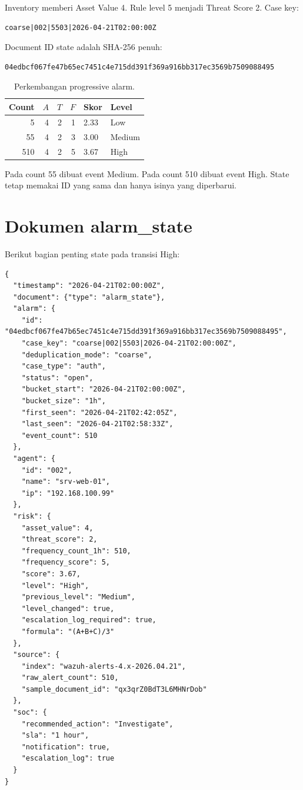 \documentclass[11pt,a4paper,oneside]{report}
\begin{document}
Inventory memberi Asset Value 4. Rule level 5 menjadi Threat Score 2. Case key:

\begin{lstlisting}
coarse|002|5503|2026-04-21T02:00:00Z
\end{lstlisting}

Document ID state adalah SHA-256 penuh:

\begin{lstlisting}
04edbcf067fe47b65ec7451c4e715dd391f369a916bb317ec3569b7509088495
\end{lstlisting}

\begin{table}[ht]
\centering
\caption{Perkembangan progressive alarm.}
\begin{tabular}{rrrrll}
\toprule
\textbf{Count} & $A$ & $T$ & $F$ & \textbf{Skor} & \textbf{Level}\\
\midrule
5 & 4 & 2 & 1 & 2.33 & Low\\
55 & 4 & 2 & 3 & 3.00 & Medium\\
510 & 4 & 2 & 5 & 3.67 & High\\
\bottomrule
\end{tabular}
\end{table}

Pada count 55 dibuat event Medium. Pada count 510 dibuat event High. State tetap
memakai ID yang sama dan hanya isinya yang diperbarui.

\chapter{Dokumen alarm\_state}

Berikut bagian penting state pada transisi High:

\begin{lstlisting}
{
  "timestamp": "2026-04-21T02:00:00Z",
  "document": {"type": "alarm_state"},
  "alarm": {
    "id": "04edbcf067fe47b65ec7451c4e715dd391f369a916bb317ec3569b7509088495",
    "case_key": "coarse|002|5503|2026-04-21T02:00:00Z",
    "deduplication_mode": "coarse",
    "case_type": "auth",
    "status": "open",
    "bucket_start": "2026-04-21T02:00:00Z",
    "bucket_size": "1h",
    "first_seen": "2026-04-21T02:42:05Z",
    "last_seen": "2026-04-21T02:58:33Z",
    "event_count": 510
  },
  "agent": {
    "id": "002",
    "name": "srv-web-01",
    "ip": "192.168.100.99"
  },
  "risk": {
    "asset_value": 4,
    "threat_score": 2,
    "frequency_count_1h": 510,
    "frequency_score": 5,
    "score": 3.67,
    "level": "High",
    "previous_level": "Medium",
    "level_changed": true,
    "escalation_log_required": true,
    "formula": "(A+B+C)/3"
  },
  "source": {
    "index": "wazuh-alerts-4.x-2026.04.21",
    "raw_alert_count": 510,
    "sample_document_id": "qx3qrZ0BdT3L6MHNrDob"
  },
  "soc": {
    "recommended_action": "Investigate",
    "sla": "1 hour",
    "notification": true,
    "escalation_log": true
  }
}
\end{lstlisting}
\end{document}
